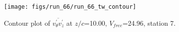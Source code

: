 \begin{figure}[H]
\centering
\texttt{[image: figs/run\_66/run\_66\_tw\_contour]}
\caption{Contour plot of $\overline{v_{\theta}^{\prime} v_{z}^{\prime}}$ at $z/c$=10.00, $V_{free}$=24.96, station 7.}
\label{fig:run_66_tw_contour}
\end{figure}


